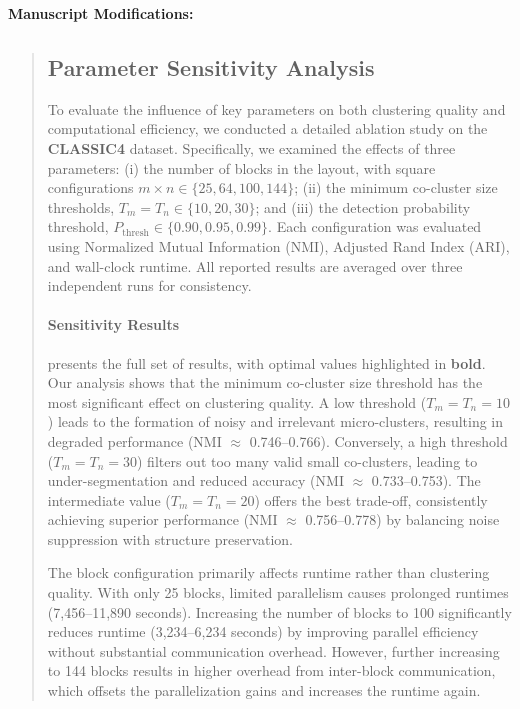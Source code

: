 \documentclass{ar2rc}
\theoremstyle{definition}
\theoremstyle{remark} %
\begin{document}
\textbf{Manuscript Modifications:}
\begin{quote}
  \subsection*{ Parameter Sensitivity Analysis}

  To evaluate the influence of key parameters on both clustering quality and computational efficiency, we conducted a detailed ablation study on the \textbf{CLASSIC4} dataset. Specifically, we examined the effects of three parameters: (i) the number of blocks in the layout, with square configurations $m \times n \in \{25, 64, 100, 144\}$; (ii) the minimum co-cluster size thresholds, $T_m = T_n \in \{10, 20, 30\}$; and (iii) the detection probability threshold, $P_{\text{thresh}} \in \{0.90, 0.95, 0.99\}$. Each configuration was evaluated using Normalized Mutual Information (NMI), Adjusted Rand Index (ARI), and wall-clock runtime. All reported results are averaged over three independent runs for consistency.

  \paragraph{Sensitivity Results}
   presents the full set of results, with optimal values highlighted in \textbf{bold}. Our analysis shows that the minimum co-cluster size threshold has the most significant effect on clustering quality. A low threshold ($T_m = T_n = 10$) leads to the formation of noisy and irrelevant micro-clusters, resulting in degraded performance (NMI $\approx$ 0.746--0.766). Conversely, a high threshold ($T_m = T_n = 30$) filters out too many valid small co-clusters, leading to under-segmentation and reduced accuracy (NMI $\approx$ 0.733--0.753). The intermediate value ($T_m = T_n = 20$) offers the best trade-off, consistently achieving superior performance (NMI $\approx$ 0.756--0.778) by balancing noise suppression with structure preservation.

  The block configuration primarily affects runtime rather than clustering quality. With only 25 blocks, limited parallelism causes prolonged runtimes (7,456--11,890 seconds). Increasing the number of blocks to 100 significantly reduces runtime (3,234--6,234 seconds) by improving parallel efficiency without substantial communication overhead. However, further increasing to 144 blocks results in higher overhead from inter-block communication, which offsets the parallelization gains and increases the runtime again.


\end{quote}
\end{document}
